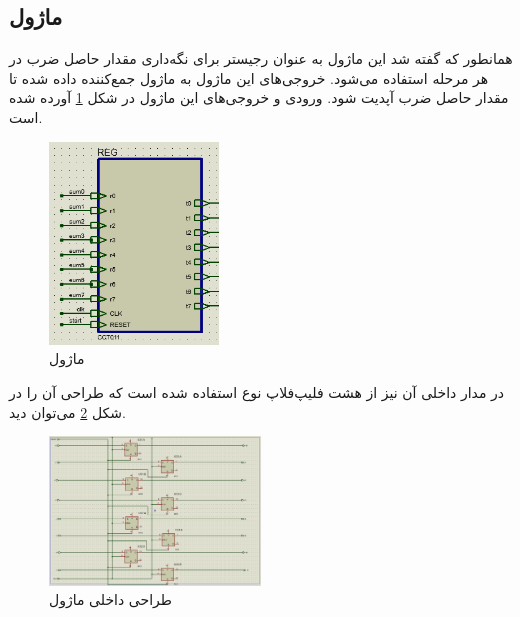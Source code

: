 \documentclass[12pt,onecolumn,a4paper,fleqn]{article}
\begin{document}
	\subsection{ماژول ‌}
	همانطور که گفته شد این ماژول به عنوان رجیستر برای نگه‌داری مقدار حاصل ضرب در هر مرحله استفاده می‌شود. خروجی‌های این ماژول به ماژول جمع‌کننده داده شده تا مقدار حاصل ضرب آپدیت شود. ورودی‌ و خروجی‌های این ماژول در شکل \ref{fig:register} آورده شده است.
	\begin{figure}[H]
		\centering
		\includegraphics[width=0.4\textwidth]{source/register.png}
		\caption{ماژول }
		\label{fig:register}
	\end{figure}
	در مدار داخلی آن نیز از هشت فلیپ‌فلاپ نوع  استفاده شده است که طراحی آن را در شکل \ref{fig:register_inner} می‌توان دید.
	\begin{figure}[H]
		\centering
		\includegraphics[width=0.5\textwidth]{source/register_inner.png}
		\caption{طراحی داخلی ماژول }
		\label{fig:register_inner}
	\end{figure}
	\newpage
\end{document}

